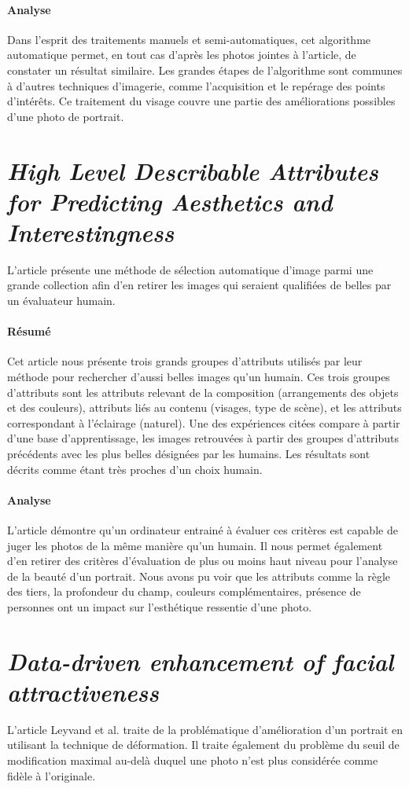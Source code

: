 \documentclass[11pt, french,screen]{report-rd-info}
\begin{document}
\paragraph{Analyse}
Dans l'esprit des traitements manuels et semi-automatiques, cet algorithme automatique permet, en tout cas d'après les photos jointes à l'article, de constater un résultat similaire.
Les grandes étapes de l'algorithme sont communes à d'autres techniques d'imagerie, comme l'acquisition et le repérage des points d'intérêts.
Ce traitement du visage couvre une partie des améliorations possibles d'une photo de portrait.
\section{\emph{High Level Describable Attributes for Predicting Aesthetics and Interestingness}}
L'article \cite{Dhar}  présente une méthode de sélection automatique d'image parmi une grande collection afin d'en retirer les images qui seraient qualifiées de belles par un évaluateur humain.
\paragraph{Résumé}
Cet article nous présente trois grands groupes d'attributs utilisés par leur méthode pour rechercher d'aussi belles images qu'un humain.
Ces trois groupes d'attributs sont les attributs relevant de la composition (arrangements des objets et des couleurs), attributs liés au contenu (visages, type de scène), et les attributs correspondant à l'éclairage (naturel).
Une des expériences citées compare à partir d'une base d'apprentissage, les images retrouvées à partir des groupes d'attributs précédents avec les plus belles désignées par les humains. Les résultats sont décrits comme étant très proches d'un choix humain.
\paragraph{Analyse}
L'article démontre qu'un ordinateur entrainé à évaluer ces critères est capable de juger les photos de la même manière qu'un humain.
Il nous permet également d'en retirer des critères d'évaluation de plus ou moins haut niveau pour l'analyse de la beauté d'un portrait.
Nous avons pu voir que les attributs comme la règle des tiers, la profondeur du champ, couleurs complémentaires, présence de personnes ont un impact sur l'esthétique ressentie d'une photo.
\section{\emph{Data-driven enhancement of facial attractiveness}}
L'article Leyvand et al. \cite{Leyvand2008} traite de la problématique d'amélioration d'un portrait en utilisant la technique de déformation. Il traite également du problème du seuil de modification maximal au-delà duquel une photo n'est plus considérée comme fidèle à l'originale.
\end{document}
